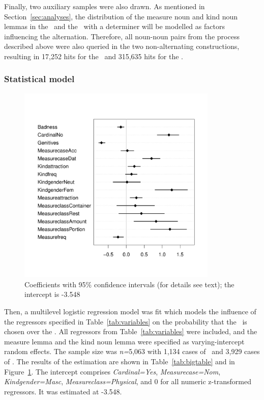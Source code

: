 Finally, two auxiliary samples were also drawn.
As mentioned in Section~\ref{sec:analyses}, the distribution of the measure noun and kind noun lemmas in the \NACb\ and the \PGCd\ with a determiner will be modelled as factors influencing the alternation.
Therefore, all noun-noun pairs from the process described above were also queried in the two non-alternating constructions, resulting in 17,252 hits for the \PGCd\ and 315,635 hits for the \NACb.

\subsubsection{Statistical model}
\label{sec:mainstudystatisticalmodel}

\begin{figure}[hb!]
  \centering
  \includegraphics[width=0.85\textwidth]{../R/output/corpus_fixeffs}
  \caption{Coefficients with 95\% confidence intervals (for details see text); the intercept is -3.548}
  \label{fig:fixeffs}
\end{figure}

Then, a multilevel logistic regression model was fit which models the influence of the regressors specified in Table~\ref{tab:variables} on the probability that the \PGCa\ is chosen over the \NACa.
All regressors from Table~\ref{tab:variables} were included, and the measure lemma and the kind noun lemma were specified as varying-intercept random effects.
The sample size was \textit{n=}5,063 with 1,134 cases of \PGCa\ and 3,929 cases of \NACa.
The results of the estimation are shown in Table~\ref{tab:bigtable} and in Figure~\ref{fig:fixeffs}.
The intercept comprises \textit{Cardinal=Yes}, \textit{Measurecase=Nom}, \textit{Kindgender=Masc}, \textit{Measureclass=Physical}, and 0 for all numeric z-transformed regressors.
It was estimated at -3.548.

